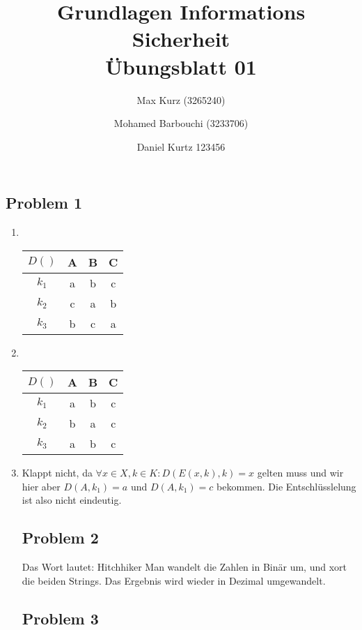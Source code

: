 \documentclass[12pt, german]{article}
\title{Grundlagen Informations Sicherheit \\ Übungsblatt 01}
\author{Max Kurz (3265240)  \and Mohamed Barbouchi (3233706) \and Daniel Kurtz {123456}}
\date{}
\begin{document}
	\maketitle

    \subsection*{Problem 1}
    \begin{enumerate}[label=\alph*)]
    	\item  ~\par
    		\begin{table}[h!]
    		\centering
    		\begin{tabular}{c | c | c | c }
    			$D()$ & A & B & C \\ \hline
    		 	$k_1$ & a & b & c \\ \hline
    		 	$k_2$ & c & a & b \\ \hline
    		 	$k_3$ & b & c & a 
    		\end{tabular}
    	\end{table}
    		
    	\item  ~\par
    	\begin{table}[h!]
    		\centering
    		\begin{tabular}{c | c | c | c }
    			$D()$ & A & B & C \\ \hline
    			$k_1$ & a & b & c \\ \hline
    			$k_2$ & b & a & c \\ \hline
    			$k_3$ & a & b & c 
    		\end{tabular}
    	\end{table}
    	
    	\item Klappt nicht, da $\forall x \in X, k \in K: D(E(x, k), k) = x$ gelten muss und wir hier aber $D(A, k_1) = a$ und  $D(A, k_1) = c$ bekommen. Die Entschlüsslelung ist also nicht eindeutig.
    	
    	\subsection*{Problem 2}
    	Das Wort lautet: Hitchhiker
    	Man wandelt die Zahlen in Binär um, und xort die beiden Strings. Das Ergebnis wird wieder in Dezimal umgewandelt. 
    	
    	\newpage
    	\subsection*{Problem 3}
    	\begin{enumerate}[label=\alph*)]
    	

\end{enumerate}
\end{enumerate}
\end{document}
